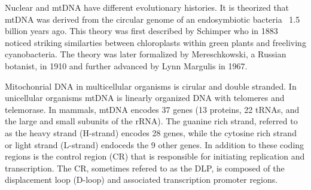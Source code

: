 \documentclass{report}\usepackage[]{graphicx}\usepackage[]{color}
\begin{document}
Nuclear and mtDNA have different evolutionary histories. It is theorized that mtDNA was derived from
the circular genome of an endosymbiotic bacteria ~1.5 billion years ago. This theory was first 
described by Schimper who in 1883 noticed striking similarties between chloroplasts within green plants and 
freeliving cyanobacteria. The theory was later formalized by Mereschkowski, a Russian botanist, in 1910 and 
 further advanced by Lynn Margulis in 1967. 

Mitochonrial DNA in multicellular organisms is cirular and double stranded. In unicellular organisms mtDNA
is linearly organized DNA with telomeres and telemorase. In mammals, mtDNA encodes 37 genes (13 proteins, 
22 tRNAs, and the large and small subunits of the rRNA). The guanine rich strand, referred to
as the heavy strand (H-strand) encodes 28 genes, while the cytosine rich strand or light strand (L-strand)
endoceds the 9 other genes. In addition to these coding regions is the control region (CR) that is
responsible for initiating replication and transcription. The CR, sometimes refered to as the DLP,
is composed of the displacement loop (D-loop) and associated transcription promoter regions. 
\end{document}
